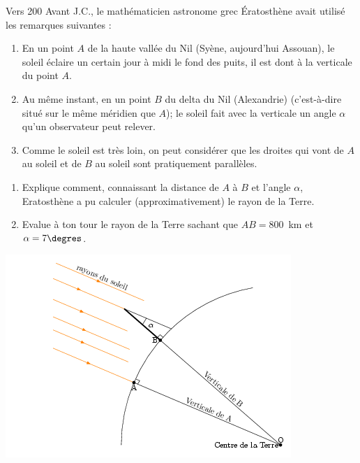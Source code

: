 
\begin{multicols}{2}
Vers 200 Avant J.C., le mathématicien astronome grec \'Eratosthène avait utilisé les remarques suivantes :
\begin{enumerate}
\item[\ding{172}] En un point $A$ de la haute vallée du Nil (Syène, aujourd'hui Assouan), le soleil éclaire un certain jour à midi le fond des puits, il est dont à la verticale du point $A$.
\item[\ding{173}] Au même instant, en un point $B$ du delta du Nil 
(Alexandrie) (c'est-à-dire situé sur le même méridien que $A$); le soleil fait avec la verticale un angle $\alpha$ qu'un observateur peut relever.
\item[\ding{174}] Comme le soleil est très loin, on peut considérer que les droites qui vont de $A$ au soleil et de $B$ au soleil sont pratiquement parallèles.
\end{enumerate}
\begin{enumerate}
  \item Explique comment, connaissant la distance de $A$ à $B$ et l'angle $\alpha$, Eratosthène a pu calculer (approximativement) le rayon de la Terre.
\item Evalue à ton tour le rayon de la Terre sachant que $AB=800$~km et $\alpha=7\degres$.
\end{enumerate}
 
 \includegraphics[scale=1]{TR-217.png}  
  \end{multicols}